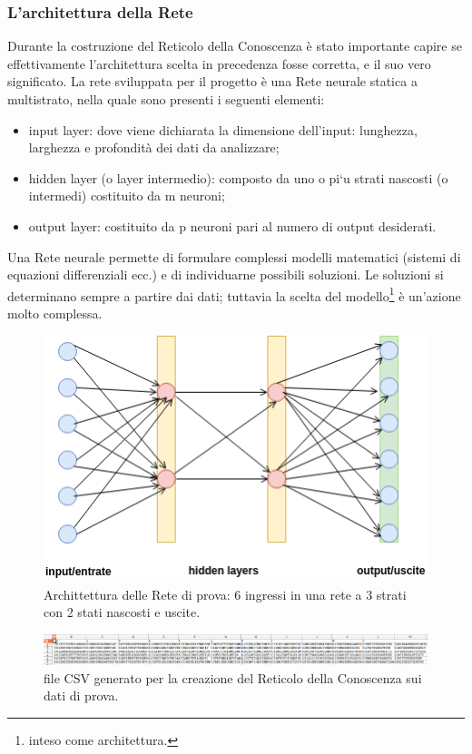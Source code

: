 \subsubsection{L'architettura della Rete}
\label{L'architettura della Rete}
Durante la costruzione del Reticolo della Conoscenza \`e stato importante capire se effettivamente l'architettura scelta in precedenza fosse corretta, e il suo vero significato. La rete sviluppata per il progetto \`e una Rete neurale statica a multistrato, nella quale sono presenti i seguenti elementi:
\begin{itemize}
\item input layer: dove viene dichiarata la dimensione dell'input: lunghezza, larghezza e profondit\`a dei dati da analizzare;
\item hidden layer (o layer intermedio): composto da uno o pi`u strati nascosti (o intermedi) costituito da m neuroni;
\item output layer:  costituito da p neuroni pari al numero di output desiderati.
\end{itemize}
\noindent 
Una Rete neurale permette di formulare complessi modelli matematici (sistemi di equazioni differenziali ecc.) e di individuarne possibili soluzioni. Le soluzioni si determinano sempre a partire dai dati; tuttavia la scelta del modello\footnote{inteso come architettura.} \`e un'azione molto complessa.

\noindent
\begin{figure}[H]
\centering
	\includegraphics[width=0.60\linewidth]{./image/architettura-rete-prova.png}
	\caption{Archittettura delle Rete di prova: 6 ingressi in una rete a 3 strati con 2 stati nascosti e uscite.}
	\label{Archittettura delle Rete di prova: 6 ingressi in una rete a 3 strati con 2 stati nascosti e uscite.}
\end{figure}
\noindent


\noindent
\begin{figure}[H]
\centering
	\includegraphics[width=1\linewidth]{./image/fileCSV_rete-prova.png}
	\caption{file CSV generato per la creazione del Reticolo della Conoscenza sui dati di prova.}
	\label{file CSV generato per la creazione del Reticolo della Conoscenza sui dati di prova.}
\end{figure}
\noindent

